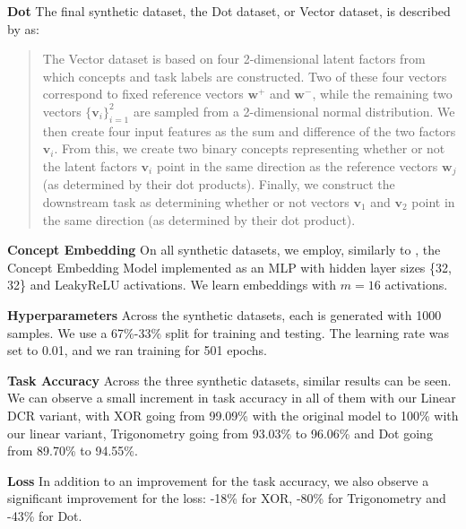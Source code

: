 \documentclass[sigconf, nonacm]{acmart}
\begin{document}
\textbf{Dot} The final synthetic dataset, the Dot dataset, or Vector dataset, is described by \citet{barbiero2023interpretable} as:
\begin{quote}
The Vector dataset is based on four 2-dimensional latent factors from which concepts and task labels are constructed. Two of these four vectors correspond to fixed reference vectors \( \mathbf{w}^+ \) and \( \mathbf{w}^- \), while the remaining two vectors \( \{ \mathbf{v}_i \}_{i=1}^2 \) are sampled from a 2-dimensional normal distribution. We then create four input features as the sum and difference of the two factors \( \mathbf{v}_i \). From this, we create two binary concepts representing whether or not the latent factors \( \mathbf{v}_i \) point in the same direction as the reference vectors \( \mathbf{w}_j \) (as determined by their dot products). Finally, we construct the downstream task as determining whether or not vectors \( \mathbf{v}_1 \) and \( \mathbf{v}_2 \) point in the same direction (as determined by their dot product).
\end{quote} \vspace{8pt}

\textbf{Concept Embedding} On all synthetic datasets, we employ, similarly to \citet{barbiero2023interpretable}, the Concept Embedding Model \citep{espinosa2022concept} implemented as an MLP with hidden layer sizes \{32, 32\} and LeakyReLU activations. We learn embeddings with \( m = 16 \) activations. \vspace{8pt}

\textbf{Hyperparameters} Across the synthetic datasets, each is generated with 1000 samples. We use a 67\%-33\% split for training and testing. The learning rate was set to 0.01, and we ran training for 501 epochs. \vspace{8pt}

\textbf{Task Accuracy} Across the three synthetic datasets, similar results can be seen. We can observe a small increment in task accuracy in all of them with our Linear DCR variant, with XOR going from 99.09\% with the original model to 100\% with our linear variant, Trigonometry going from 93.03\% to 96.06\% and Dot going from 89.70\% to 94.55\%. \vspace{8pt}

\textbf{Loss} In addition to an improvement for the task accuracy, we also observe a significant improvement for the loss: -18\% for XOR, -80\% for Trigonometry and -43\% for Dot.\vspace{8pt}
\end{document}
